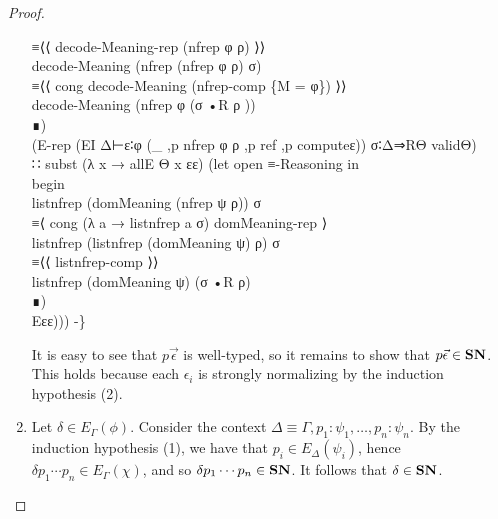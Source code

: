 \begin{proof}
\begin{enumerate}
\begin{code}
{\>      ≡⟨⟨ decode-Meaning-rep (nfrep φ ρ) ⟩⟩\<\\
\>        decode-Meaning (nfrep (nfrep φ ρ) σ)\<\\
\>      ≡⟨⟨ cong decode-Meaning (nfrep-comp \{M = φ\}) ⟩⟩\<\\
\>        decode-Meaning (nfrep φ (σ •R ρ ))\<\\
\>      ∎) \<\\
\>      (E-rep (EI Δ⊢ε∶φ (\_ ,p nfrep φ ρ ,p ref ,p computeε)) σ∶Δ⇒RΘ validΘ) \<\\
\>    ∷ subst (λ x → allE Θ x εε) (let open ≡-Reasoning in \<\\
\>    begin\<\\
\>      listnfrep (domMeaning (nfrep ψ ρ)) σ\<\\
\>    ≡⟨ cong (λ a → listnfrep a σ) domMeaning-rep ⟩\<\\
\>      listnfrep (listnfrep (domMeaning ψ) ρ) σ\<\\
\>    ≡⟨⟨ listnfrep-comp ⟩⟩\<\\
\>      listnfrep (domMeaning ψ) (σ •R ρ)\<\\
\>    ∎) \<\\
\>    Eεε))) -\}}\<%
\\
\>\<%
\end{code}
It is easy to see that $p \vec{\epsilon}$ is well-typed, so it remains to show that $p \vec{\epsilon} \in \mathbf{SN}$.
This holds because each $\epsilon_i$ is strongly normalizing by the induction hypothesis (2).
\item
Let $\delta \in E_\Gamma(\phi)$.  Consider the context $\Delta \equiv \Gamma, p_1 : \psi_1, \ldots, p_n : \psi_n$.
By the induction hypothesis (1), we have that $p_i \in E_\Delta(\psi_i)$, hence
$\delta p_1 \cdots p_n \in E_\Gamma(\chi)$, and so $\delta p_1 \cdots p_n \in \mathbf{SN}$.
It follows that $\delta \in \mathbf{SN}$.
\end{enumerate}
\end{proof}
